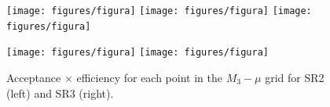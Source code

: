 \begin{figure}[hb!]
  \centering
  \texttt{[image: figures/figura]} %
  \texttt{[image: figures/figura]} %
  \texttt{[image: figures/figura]} %
  \label{fig:opt_exp_significance}
\end{figure}




\begin{figure}[h!]
  \centering
  \texttt{[image: figures/figura]} %
  \texttt{[image: figures/figura]} %
  \caption{Acceptance $\times$ efficiency for each point in the $M_3-\mu$ grid for SR2 (left) and SR3 (right).}
  \label{fig:efficiency}
\end{figure}




